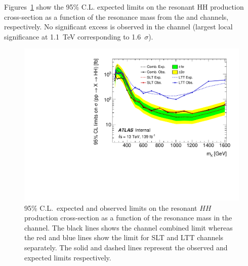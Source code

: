 




Figures~\ref{fig:LepHadLimits} show the 95\% C.L. expected limits on 
the resonant HH production cross-section as a function of the resonance mass from the \hadhad and \lephad channels, respectively. 
No significant excess is observed in the \lephad channel (largest local significance at 1.1~TeV corresponding to 1.6~$\sigma$).

\begin{figure}[htbp]
\centering
\includegraphics[width=.8\textwidth]{figures/results/HH/LepHad/LepHad_Limits_Split.pdf}
\caption{95\% C.L.\ expected and observed limits on the resonant $HH$ production cross-section
as a function of the resonance mass in the \lephad channel.
The black lines shows the \lephad channel combined limit whereas the red and blue lines 
show the limit for SLT and LTT channels separately. 
The solid and dashed lines represent the observed and expected limits respectively.}
\label{fig:LepHadLimits}
\end{figure}

